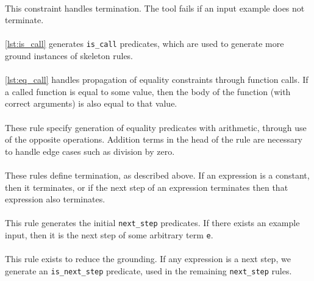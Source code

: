  
\mbox{} \\
This constraint handles termination. The tool fails if an input example does not terminate.\\

 
\mbox{} \\
\ref{lst:is_call} generates \lstinline{is_call} predicates, which are used to generate more ground instances of skeleton rules. \\ %

 
\mbox{} \\
\ref{lst:eq_call} handles propagation of equality constraints through function calls. If a called function is equal to some value, then the body of the function (with correct arguments) is also equal to that value. \\

 
\mbox{} \\
These rule specify generation of equality predicates with arithmetic, through use of the opposite operations. Addition terms in the head of the rule are necessary to handle edge cases such as division by zero. \\

 
\mbox{} \\
These rules define termination, as described above. If an expression is a constant, then it terminates, or if the next step of an expression terminates then that expression also terminates. \\

 
\mbox{} \\
This rule generates the initial \lstinline{next_step} predicates. If there exists an example input, then it is the next step of some arbitrary term \lstinline{e}. \\

 
\mbox{} \\
This rule exists to reduce the grounding. If any expression is a next step, we generate an \lstinline{is_next_step} predicate, used in the remaining \lstinline{next_step} rules.

